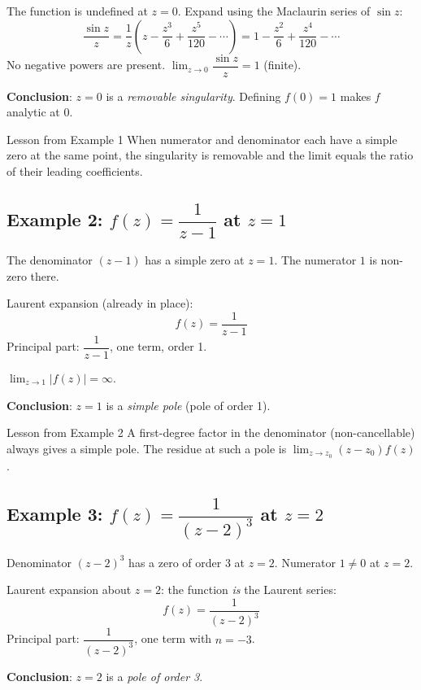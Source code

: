 \documentclass[12pt,a4paper]{article}
\begin{document}
The function is undefined at $z = 0$.
Expand using the Maclaurin series of $\sin z$:
\[
  \frac{\sin z}{z} = \frac{1}{z}\!\left(z - \frac{z^3}{6} + \frac{z^5}{120} - \cdots\right)
  = 1 - \frac{z^2}{6} + \frac{z^4}{120} - \cdots
\]
No negative powers are present.
$\lim_{z\to 0} \dfrac{\sin z}{z} = 1$ (finite).

\textbf{Conclusion}: $z = 0$ is a \emph{removable singularity}.
Defining $f(0) = 1$ makes $f$ analytic at $0$.

\begin{learnbox}{Lesson from Example 1}
When numerator and denominator each have a simple zero at the same point,
the singularity is removable and the limit equals the ratio of their leading coefficients.
\end{learnbox}

\subsection*{Example 2: $f(z) = \dfrac{1}{z - 1}$ at $z = 1$}

The denominator $(z-1)$ has a simple zero at $z = 1$.
The numerator $1$ is non-zero there.

Laurent expansion (already in place):
\[
  f(z) = \frac{1}{z-1}
\]
Principal part: $\dfrac{1}{z-1}$, one term, order 1.

$\lim_{z\to 1}|f(z)| = \infty$.

\textbf{Conclusion}: $z = 1$ is a \emph{simple pole} (pole of order 1).

\begin{learnbox}{Lesson from Example 2}
A first-degree factor in the denominator (non-cancellable) always gives a simple pole.
The residue at such a pole is $\lim_{z\to z_0}(z-z_0)f(z)$.
\end{learnbox}

\subsection*{Example 3: $f(z) = \dfrac{1}{(z-2)^3}$ at $z = 2$}

Denominator $(z-2)^3$ has a zero of order 3 at $z = 2$.
Numerator $1 \neq 0$ at $z = 2$.

Laurent expansion about $z = 2$: the function \emph{is} the Laurent series:
\[
  f(z) = \frac{1}{(z-2)^3}
\]
Principal part: $\dfrac{1}{(z-2)^3}$, one term with $n = -3$.

\textbf{Conclusion}: $z = 2$ is a \emph{pole of order 3}.
\end{document}
